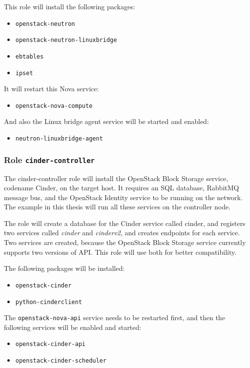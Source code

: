 This role will install the following packages:
\begin{itemize}
  \item{\texttt{openstack-neutron}}
  \item{\texttt{openstack-neutron-linuxbridge}}
  \item{\texttt{ebtables}}
  \item{\texttt{ipset}}
\end{itemize}
It will restart this Nova service:
\begin{itemize}
  \item{\texttt{openstack-nova-compute}}
\end{itemize}
And also the Linux bridge agent service will be started and enabled:
\begin{itemize}
  \item{\texttt{neutron-linuxbridge-agent}}
\end{itemize}



\subsubsection*{Role \texttt{cinder-controller}}

The cinder-controller role will install the OpenStack Block Storage service, codename Cinder, on the target host. It requires an SQL database, RabbitMQ message bus, and the OpenStack Identity service to be running on the network. The example in this thesis will run all these services on the controller node.

The role will create a database for the Cinder service called cinder, and registers two services called \textit{cinder} and \textit{cinderv2}, and creates endpoints for each service. Two services are created, because the OpenStack Block Storage service currently supports two versions of API. This role will use both for better compatibility.

The following packages will be installed:

\begin{itemize}
  \item{\texttt{openstack-cinder}}
  \item{\texttt{python-cinderclient}}
\end{itemize}

The \texttt{openstack-nova-api} service needs to be restarted first, and then the following services will be enabled and started:
\begin{itemize}
  \item{\texttt{openstack-cinder-api}}
  \item{\texttt{openstack-cinder-scheduler}}
\end{itemize}


